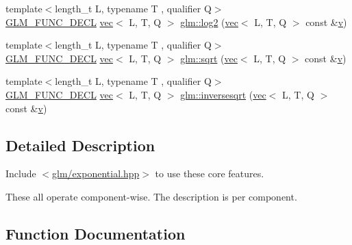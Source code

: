 \begin{DoxyCompactItemize}
\item 
{\footnotesize template$<$length\+\_\+t L, typename T , qualifier Q$>$ }\\\hyperlink{setup_8hpp_ab2d052de21a70539923e9bcbf6e83a51}{G\+L\+M\+\_\+\+F\+U\+N\+C\+\_\+\+D\+E\+CL} \hyperlink{structglm_1_1vec}{vec}$<$ L, T, Q $>$ \hyperlink{group__core__func__exponential_ga82831c7d9cca777cebedfe03a19c8d75}{glm\+::log2} (\hyperlink{structglm_1_1vec}{vec}$<$ L, T, Q $>$ const \&\hyperlink{_s_d_l__opengl_8h_a10a82eabcb59d2fcd74acee063775f90}{v})
\item 
{\footnotesize template$<$length\+\_\+t L, typename T , qualifier Q$>$ }\\\hyperlink{setup_8hpp_ab2d052de21a70539923e9bcbf6e83a51}{G\+L\+M\+\_\+\+F\+U\+N\+C\+\_\+\+D\+E\+CL} \hyperlink{structglm_1_1vec}{vec}$<$ L, T, Q $>$ \hyperlink{group__core__func__exponential_gaa83e5f1648b7ccdf33b87c07c76cb77c}{glm\+::sqrt} (\hyperlink{structglm_1_1vec}{vec}$<$ L, T, Q $>$ const \&\hyperlink{_s_d_l__opengl_8h_a10a82eabcb59d2fcd74acee063775f90}{v})
\item 
{\footnotesize template$<$length\+\_\+t L, typename T , qualifier Q$>$ }\\\hyperlink{setup_8hpp_ab2d052de21a70539923e9bcbf6e83a51}{G\+L\+M\+\_\+\+F\+U\+N\+C\+\_\+\+D\+E\+CL} \hyperlink{structglm_1_1vec}{vec}$<$ L, T, Q $>$ \hyperlink{group__core__func__exponential_ga523dd6bd0ad9f75ae2d24c8e4b017b7a}{glm\+::inversesqrt} (\hyperlink{structglm_1_1vec}{vec}$<$ L, T, Q $>$ const \&\hyperlink{_s_d_l__opengl_8h_a10a82eabcb59d2fcd74acee063775f90}{v})
\end{DoxyCompactItemize}


\subsection{Detailed Description}
Include $<$\hyperlink{exponential_8hpp}{glm/exponential.\+hpp}$>$ to use these core features.

These all operate component-\/wise. The description is per component. 

\subsection{Function Documentation}
\mbox{\label{group__core__func__exponential_ga071566cadc7505455e611f2a0353f4d4}} 
